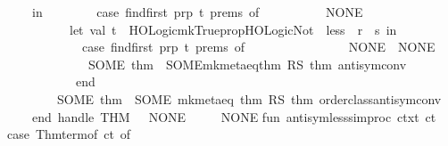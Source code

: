 \begin{isabellebody}
\ \ \ \ \ \ in\isanewline
\ \ \ \ \ \ \ \ {\isacharparenleft}{\kern0pt}case\ find{\isacharunderscore}{\kern0pt}first\ {\isacharparenleft}{\kern0pt}prp\ t{\isacharparenright}{\kern0pt}\ prems\ of\isanewline
\ \ \ \ \ \ \ \ \ \ NONE\ {\isacharequal}{\kern0pt}{\isachargreater}{\kern0pt}\isanewline
\ \ \ \ \ \ \ \ \ \ \ \ let\ val\ t\ {\isacharequal}{\kern0pt}\ HOLogic{\isachardot}{\kern0pt}mk{\isacharunderscore}{\kern0pt}Trueprop{\isacharparenleft}{\kern0pt}HOLogic{\isachardot}{\kern0pt}Not\ {\isachardollar}{\kern0pt}\ {\isacharparenleft}{\kern0pt}less\ {\isachardollar}{\kern0pt}\ r\ {\isachardollar}{\kern0pt}\ s{\isacharparenright}{\kern0pt}{\isacharparenright}{\kern0pt}\ in\isanewline
\ \ \ \ \ \ \ \ \ \ \ \ \ \ {\isacharparenleft}{\kern0pt}case\ find{\isacharunderscore}{\kern0pt}first\ {\isacharparenleft}{\kern0pt}prp\ t{\isacharparenright}{\kern0pt}\ prems\ of\isanewline
\ \ \ \ \ \ \ \ \ \ \ \ \ \ \ \ NONE\ {\isacharequal}{\kern0pt}{\isachargreater}{\kern0pt}\ NONE\isanewline
\ \ \ \ \ \ \ \ \ \ \ \ \ \ {\isacharbar}{\kern0pt}\ SOME\ thm\ {\isacharequal}{\kern0pt}{\isachargreater}{\kern0pt}\ SOME{\isacharparenleft}{\kern0pt}mk{\isacharunderscore}{\kern0pt}meta{\isacharunderscore}{\kern0pt}eq{\isacharparenleft}{\kern0pt}thm\ RS\ {\isacharat}{\kern0pt}{\isacharbraceleft}{\kern0pt}thm\ antisym{\isacharunderscore}{\kern0pt}conv{}{\isacharbraceright}{\kern0pt}{\isacharparenright}{\kern0pt}{\isacharparenright}{\kern0pt}{\isacharparenright}{\kern0pt}\isanewline
\ \ \ \ \ \ \ \ \ \ \ \ \ end\isanewline
\ \ \ \ \ \ \ \ \ {\isacharbar}{\kern0pt}\ SOME\ thm\ {\isacharequal}{\kern0pt}{\isachargreater}{\kern0pt}\ SOME\ {\isacharparenleft}{\kern0pt}mk{\isacharunderscore}{\kern0pt}meta{\isacharunderscore}{\kern0pt}eq\ {\isacharparenleft}{\kern0pt}thm\ RS\ {\isacharat}{\kern0pt}{\isacharbraceleft}{\kern0pt}thm\ order{\isacharunderscore}{\kern0pt}class{\isachardot}{\kern0pt}antisym{\isacharunderscore}{\kern0pt}conv{\isacharbraceright}{\kern0pt}{\isacharparenright}{\kern0pt}{\isacharparenright}{\kern0pt}{\isacharparenright}{\kern0pt}\isanewline
\ \ \ \ \ \ end\ handle\ THM\ {\isacharunderscore}{\kern0pt}\ {\isacharequal}{\kern0pt}{\isachargreater}{\kern0pt}\ NONE{\isacharparenright}{\kern0pt}\isanewline
\ \ {\isacharbar}{\kern0pt}\ {\isacharunderscore}{\kern0pt}\ {\isacharequal}{\kern0pt}{\isachargreater}{\kern0pt}\ NONE{\isacharparenright}{\kern0pt}{\isacharsemicolon}{\kern0pt}\isanewline
\isanewline
fun\ antisym{\isacharunderscore}{\kern0pt}less{\isacharunderscore}{\kern0pt}simproc\ ctxt\ ct\ {\isacharequal}{\kern0pt}\isanewline
\ \ {\isacharparenleft}{\kern0pt}case\ Thm{\isachardot}{\kern0pt}term{\isacharunderscore}{\kern0pt}of\ ct\ of\isanewline

\end{isabellebody}
